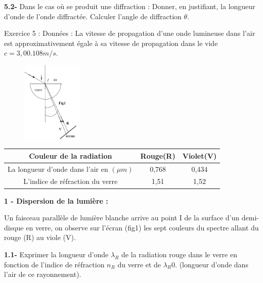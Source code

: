 \documentclass[12pt, french]{article}
\begin{document}
\textbf{5.2- }Dans le cas où se produit une diffraction : Donner, en justifiant, la longueur d’onde de l’onde
diffractée. Calculer l’angle de diffraction $\theta$.

\begin{Box2}{Exercice 5 :}
	Données : La vitesse de propagation d’une onde lumineuse dans l’air est approximativement égale à
sa vitesse de propagation dans le vide $c = 3,00.108 m/s$.

\begin{figure}
  \begin{center}
	  \vspace{-1.5cm}
	\includegraphics[width=0.26\textwidth]{./img/ex5_1.png}
  \end{center}
\end{figure}


\vspace{0.5cm}
\begin{tabular}{ |c|c|c| } 
 \hline
 Couleur de la radiation & Rouge(R) & Violet(V) \\\hline
 La longueur d’onde dans l’air en $(\mu{m})$ & 0,768 & 0,434 \\\hline 
 L’indice de réfraction du verre & 1,51 & 1,52 \\\hline 
 \hline
\end{tabular}
\vspace{0.5cm}

\textbf{1 - Dispersion de la lumière :}

Un faisceau parallèle de lumière blanche arrive au point I de la surface d’un demi-
disque en verre, on observe sur l’écran (fig1) les sept couleurs du spectre allant
du rouge (R) au viole (V).

\textbf{1.1- }Exprimer la longueur d’onde $\lambda_R$ de la radiation rouge dans le verre en
fonction de l’indice de réfraction $n_R$ du verre et de $\lambda_R0$. (longueur d’onde dans l’air de ce rayonnement).


\end{Box2}
\end{document}
